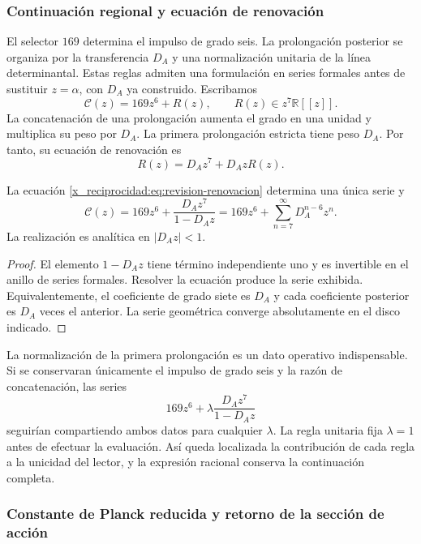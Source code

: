 \subsubsection{Continuación regional y ecuación de renovación}

El selector \(169\) determina el impulso de grado seis. La prolongación
posterior se organiza por la transferencia \(D_A\) y una normalización
unitaria de la línea determinantal. Estas reglas admiten una formulación
en series formales antes de sustituir \(z=\alpha\), con \(D_A\) ya
construido. Escribamos
\[
 \mathscr C(z)=169z^6+R(z),\qquad R(z)\in z^7\mathbb R[[z]].
\]
La concatenación de una prolongación aumenta el grado en una unidad y
multiplica su peso por \(D_A\). La primera prolongación estricta tiene
peso \(D_A\). Por tanto, su ecuación de renovación es
\begin{equation}
 R(z)=D_Az^7+D_AzR(z).
 \label{x_reciprocidad:eq:revision-renovacion}
\end{equation}

\begin{proposition}
La ecuación \eqref{x_reciprocidad:eq:revision-renovacion} determina una única serie y
\[
 \mathscr C(z)=169z^6+\frac{D_Az^7}{1-D_Az}
             =169z^6+\sum_{n=7}^{\infty}D_A^{n-6}z^n.
\]
La realización es analítica en \(|D_Az|<1\).
\end{proposition}
\begin{proof}
El elemento \(1-D_Az\) tiene término independiente uno y es invertible
en el anillo de series formales. Resolver la ecuación produce la serie
exhibida. Equivalentemente, el coeficiente de grado siete es \(D_A\)
y cada coeficiente posterior es \(D_A\) veces el anterior. La serie
geométrica converge absolutamente en el disco indicado.
\end{proof}

La normalización de la primera prolongación es un dato operativo
indispensable. Si se conservaran únicamente el impulso de grado seis y
la razón de concatenación, las series
\[
 169z^6+\lambda\frac{D_Az^7}{1-D_Az}
\]
seguirían compartiendo ambos datos para cualquier \(\lambda\).
La regla unitaria fija \(\lambda=1\) antes de efectuar la evaluación.
Así queda localizada la contribución de cada regla a la unicidad del
lector, y la expresión racional conserva la continuación completa.

\subsubsection{Constante de Planck reducida y retorno de la sección de acción}

